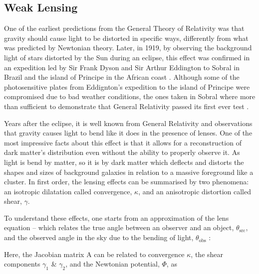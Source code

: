 \subsection{Weak Lensing}
One of the earliest predictions from the General Theory of Relativity was that gravity should cause light to be distorted in specific ways, differently from what was predicted by Newtonian theory. Later, in 1919, by observing the background light of stars distorted by the Sun during an eclipse, this effect was confirmed in an expedition led by Sir Frank Dyson and Sir Arthur Eddington to Sobral in Brazil and the island of Principe in the African coast \citep{Dyson291}. Although some of the photosensitive plates from Eddignton's expedition to the island of Principe were compromised due to bad weather conditions, the ones taken in Sobral where more than sufficient to demonstrate that General Relativity passed its first ever test \citep{2007arXiv0709.0685K}.


\qquad Years after the eclipse, it is well known from General Relativity and observations that gravity causes light to bend like it does in the presence of lenses. One of the most impressive facts about this effect is that it allows for a reconstruction of dark matter's distribution even without the ability to properly observe it. As light is bend by matter, so it is by dark matter which deflects and distorts the shapes and sizes of background galaxies in relation to a massive foreground like a cluster. In first order, the lensing effects can be summarised by two phenomena: an isotropic dilatation called convergence, $\kappa$, and an anisotropic distortion called shear, $\gamma$. 

\qquad To understand these effects, one starts from an approximation of the lens equation -- which relates the true angle between an observer and an object, $\theta_{\text{src}}$, and the observed angle in the sky due to the bending of light, $\theta_{\text{obs}}$ \citep{dods}:

Here, the Jacobian matrix A can be related to convergence $\kappa$, the shear components $\gamma_1$ \& $\gamma_2$, and the Newtonian potential, $\Phi$, as

